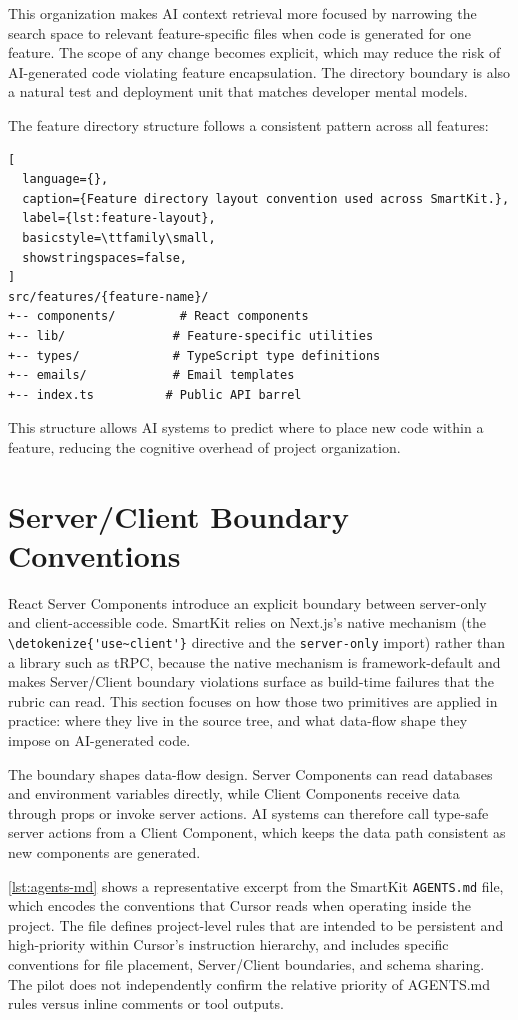 \documentclass[12pt,a4paper]{report}
\newcommand{\code}[1]{\texttt{\nolinkurl{\detokenize{#1}}}}
\newcommand{\pkg}[1]{\texttt{\nolinkurl{#1}}}
\DeclareRobustCommand{\filename}[1]{\bgroup\urlstyle{tt}\nolinkurl{#1}\egroup}
\newcommand{\usec}{\code{'use~client'}}
\begin{document}
This organization makes AI context retrieval more focused by narrowing the search space to relevant feature-specific files when code is generated for one feature. The scope of any change becomes explicit, which may reduce the risk of AI-generated code violating feature encapsulation. The directory boundary is also a natural test and deployment unit that matches developer mental models.

The feature directory structure follows a consistent pattern across all features:

\begin{lstlisting}[
  language={},
  caption={Feature directory layout convention used across SmartKit.},
  label={lst:feature-layout},
  basicstyle=\ttfamily\small,
  showstringspaces=false,
]
src/features/{feature-name}/
+-- components/         # React components
+-- lib/               # Feature-specific utilities
+-- types/             # TypeScript type definitions
+-- emails/            # Email templates
+-- index.ts          # Public API barrel
\end{lstlisting}

This structure allows AI systems to predict where to place new code within a feature, reducing the cognitive overhead of project organization.

\section{Server/Client Boundary Conventions}

React Server Components introduce an explicit boundary between server-only and client-accessible code. SmartKit relies on Next.js's native mechanism (the \usec{} directive and the \pkg{server-only} import) rather than a library such as tRPC, because the native mechanism is framework-default and makes Server/Client boundary violations surface as build-time failures that the rubric can read. This section focuses on how those two primitives are applied in practice: where they live in the source tree, and what data-flow shape they impose on AI-generated code.

The boundary shapes data-flow design. Server Components can read databases and environment variables directly, while Client Components receive data through props or invoke server actions. AI systems can therefore call type-safe server actions from a Client Component, which keeps the data path consistent as new components are generated.

\autoref{lst:agents-md} shows a representative excerpt from the SmartKit \filename{AGENTS.md} file, which encodes the conventions that Cursor reads when operating inside the project. The file defines project-level rules that are intended to be persistent and high-priority within Cursor's instruction hierarchy, and includes specific conventions for file placement, Server/Client boundaries, and schema sharing. The pilot does not independently confirm the relative priority of AGENTS.md rules versus inline comments or tool outputs.
\end{document}
